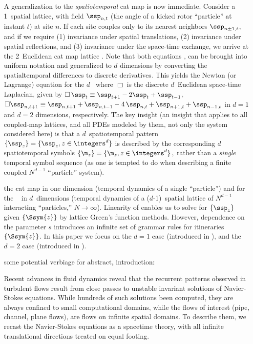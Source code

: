 \begin{description}
A generalization to the {\em spatiotemporal} cat map is now immediate.
Consider a 1\dmn\ spatial lattice, with field $\ssp_{n,t}$  (the angle of
a kicked rotor ``particle'' at instant $t$)  at site $n$. If each site
couples only to its nearest neighbors $\ssp_{n\pm1,t}$, and if we require
(1) invariance under spatial translations, (2) invariance under spatial
reflections, and (3) invariance under the space-time exchange, we arrive
at the 2\dmn\ Euclidean cat map lattice  .
Note that both equations ,
 can be brought into uniform notation  and
generalized  to $d$ dimensions by converting the spatialtemporal
differences to discrete derivatives. This yields the Newton (or Lagrange)
equation for the $d$\dmn\ {\em \catlatt} 
where $\Box$ is the discrete $d$\dmn\ Euclidean space-time Laplacian,
given by $\Box\, \ssp_t \equiv \ssp_{t+1} - 2\ssp_{t} + \ssp_{t-1}$,
$\Box \ssp_{n,t+1}\equiv \ssp_{n,t+1} + \ssp_{n,t-1} - 4 \, \ssp_{n,t} +
\ssp_{n+1,t} + \ssp_{n-1, t}$  in $d=1$ and $d=2$ dimensions,
respectively.  The key insight (an insight that applies to all
coupled-map lattices, and all PDEs modeled by them, not only the system
considered here) is that a $d$\dmn\ spatiotemporal pattern
\(
\{\ssp_{z}\} = \{\ssp_{z},  z\in \integers^{d}  \}
\)
is described by the corresponding {\em $d$\dmn} spatiotemporal
symbols {\brick}
\(
\{\m_{z}\} = \{\m_{z}, z\in \integers^{d}\}
\,,
\)
rather than a \emph{single} temporal symbol sequence (as one is tempted
to do when describing a finite coupled $N^{d-1}$-``particle'' system).

the cat map
in one dimension (temporal dynamics of a single
``particle'') and for the \catlatt\  in $d$~dimensions
(temporal dynamics of a ($d$-1)\dmn\ spatial lattice of $N^{d-1}$
interacting ``particles,'' $N\to\infty$).
Linearity of  enables us to solve for $\{\ssp_{z}\}$ given
$\{\Ssym{z}\}$ by lattice Green's function methods. However, dependence
on the parameter $s$ introduces an infinite set of grammar rules for
{\admissible} itineraries $\{\Ssym{z}\}$.
In this paper we focus on the $d=1$ case (introduced in ), and
the $d=2$ case (introduced in ).


     {
some potential verbiage for abstract, introduction:

Recent advances in fluid dynamics reveal that the recurrent patterns
observed in turbulent flows result from close passes to unstable
invariant solutions of Navier-Stokes equations. While hundreds of such
solutions been computed, they are always confined to small computational
domains, while the flows of interest (pipe, channel, plane flows), are
flows on infinite spatial domains. To describe them, we recast the
Navier-Stokes equations as a spacetime theory, with all infinite
translational directions treated on equal footing.

}
\end{description}
